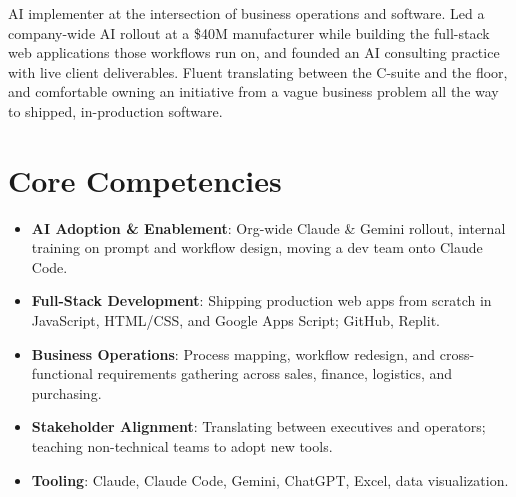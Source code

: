\documentclass[11pt,letterpaper,sans]{moderncv}
\begin{document}
\makecvtitle


\vspace{6pt}
\small{AI implementer at the intersection of business operations and software. Led a company-wide AI rollout at a \$40M manufacturer while building the full-stack web applications those workflows run on, and founded an AI consulting practice with live client deliverables. Fluent translating between the C-suite and the floor, and comfortable owning an initiative from a vague business problem all the way to shipped, in-production software.}


\section{Core Competencies}
\vspace{1pt}
\begin{itemize}
\item \textbf{AI Adoption \& Enablement}: Org-wide Claude \& Gemini rollout, internal training on prompt and workflow design, moving a dev team onto Claude Code.
\item \textbf{Full-Stack Development}: Shipping production web apps from scratch in JavaScript, HTML/CSS, and Google Apps Script; GitHub, Replit.
\item \textbf{Business Operations}: Process mapping, workflow redesign, and cross-functional requirements gathering across sales, finance, logistics, and purchasing.
\item \textbf{Stakeholder Alignment}: Translating between executives and operators; teaching non-technical teams to adopt new tools.
\item \textbf{Tooling}: Claude, Claude Code, Gemini, ChatGPT, Excel, data visualization.
\end{itemize}

\end{document}

